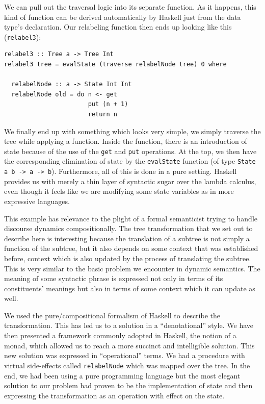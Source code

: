 \documentclass{article}
\begin{document}
We can pull out the traversal logic into its separate function. As it happens,
this kind of function can be derived automatically by Haskell just from the
data type's declaration. Our relabeling function then ends up looking like
this (\texttt{relabel3}):

\begin{lstlisting}
relabel3 :: Tree a -> Tree Int
relabel3 tree = evalState (traverse relabelNode tree) 0 where

  relabelNode :: a -> State Int Int
  relabelNode old = do n <- get
                       put (n + 1)
                       return n
\end{lstlisting}

We finally end up with something which looks very simple, we simply traverse
the tree while applying a function. Inside the function, there is an
introduction of state because of the use of the \texttt{get} and \texttt{put}
operations. At the top, we then have the corresponding elimination of state by
the \texttt{evalState} function (of type \texttt{State a b -> a ->
  b}). Furthermore, all of this is done in a pure setting. Haskell provides us
with merely a thin layer of syntactic sugar over the lambda calculus, even
though it feels like we are modifying some state variables as in more
expressive languages.

This example has relevance to the plight of a formal semanticist trying to
handle discourse dynamics compositionally. The tree transformation that we set
out to describe here is interesting because the translation of a subtree is
not simply a function of the subtree, but it also depends on some context that
was established before, context which is also updated by the process of
translating the subtree. This is very similar to the basic problem we
encounter in dynamic semantics. The meaning of some syntactic phrase is
expressed not only in terms of its constituents' meanings but also in terms of
some context which it can update as well.

We used the pure/compositional formalism of Haskell to describe the
transformation. This has led us to a solution in a ``denotational'' style. We
have then presented a framework commonly adopted in Haskell, the notion of a
monad, which allowed us to reach a more succinct and intelligible
solution. This new solution was expressed in ``operational'' terms. We had a
procedure with virtual side-effects called \texttt{relabelNode} which was
mapped over the tree. In the end, we had been using a pure programming
language but the most elegant solution to our problem had proven to be the
implementation of state and then expressing the transformation as an operation
with effect on the state.
\end{document}
